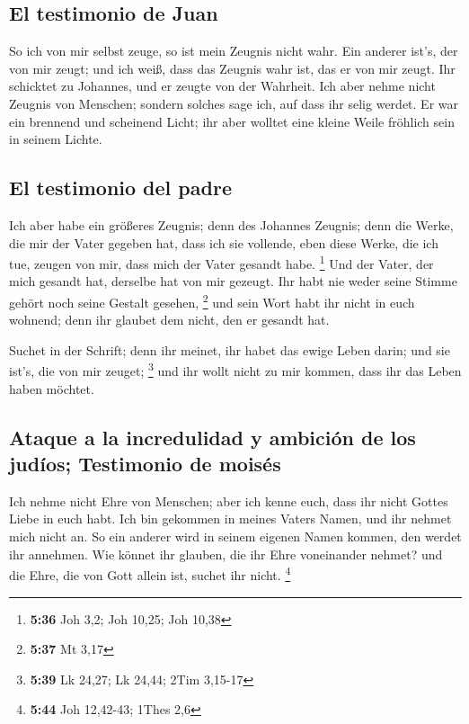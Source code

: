 \hypertarget{el-testimonio-de-juan}{%
\subsection{El testimonio de Juan}\label{el-testimonio-de-juan}}

 So ich von mir selbst zeuge, so ist mein Zeugnis nicht
wahr.  Ein anderer ist's, der von mir zeugt; und ich
weiß, dass das Zeugnis wahr ist, das er von mir zeugt. 
Ihr schicktet zu Johannes, und er zeugte von der Wahrheit.
 Ich aber nehme nicht Zeugnis von Menschen; sondern
solches sage ich, auf dass ihr selig werdet.  Er war ein
brennend und scheinend Licht; ihr aber wolltet eine kleine Weile
fröhlich sein in seinem Lichte.

\hypertarget{el-testimonio-del-padre}{%
\subsection{El testimonio del padre}\label{el-testimonio-del-padre}}

 Ich aber habe ein größeres Zeugnis; denn des Johannes
Zeugnis; denn die Werke, die mir der Vater gegeben hat, dass ich sie
vollende, eben diese Werke, die ich tue, zeugen von mir, dass mich der
Vater gesandt habe. \footnote{\textbf{5:36} Joh 3,2; Joh 10,25; Joh
  10,38}  Und der Vater, der mich gesandt hat, derselbe
hat von mir gezeugt. Ihr habt nie weder seine Stimme gehört noch seine
Gestalt gesehen, \footnote{\textbf{5:37} Mt 3,17}  und
sein Wort habt ihr nicht in euch wohnend; denn ihr glaubet dem nicht,
den er gesandt hat.

 Suchet in der Schrift; denn ihr meinet, ihr habet das
ewige Leben darin; und sie ist's, die von mir zeuget; \footnote{\textbf{5:39}
  Lk 24,27; Lk 24,44; 2Tim 3,15-17}  und ihr wollt nicht
zu mir kommen, dass ihr das Leben haben möchtet.

\hypertarget{ataque-a-la-incredulidad-y-ambiciuxf3n-de-los-juduxedos-testimonio-de-moisuxe9s}{%
\subsection{Ataque a la incredulidad y ambición de los judíos;
Testimonio de
moisés}\label{ataque-a-la-incredulidad-y-ambiciuxf3n-de-los-juduxedos-testimonio-de-moisuxe9s}}

 Ich nehme nicht Ehre von Menschen;  aber
ich kenne euch, dass ihr nicht Gottes Liebe in euch habt.
 Ich bin gekommen in meines Vaters Namen, und ihr nehmet
mich nicht an. So ein anderer wird in seinem eigenen Namen kommen, den
werdet ihr annehmen.  Wie könnet ihr glauben, die ihr
Ehre voneinander nehmet? und die Ehre, die von Gott allein ist, suchet
ihr nicht. \footnote{\textbf{5:44} Joh 12,42-43; 1Thes 2,6}

